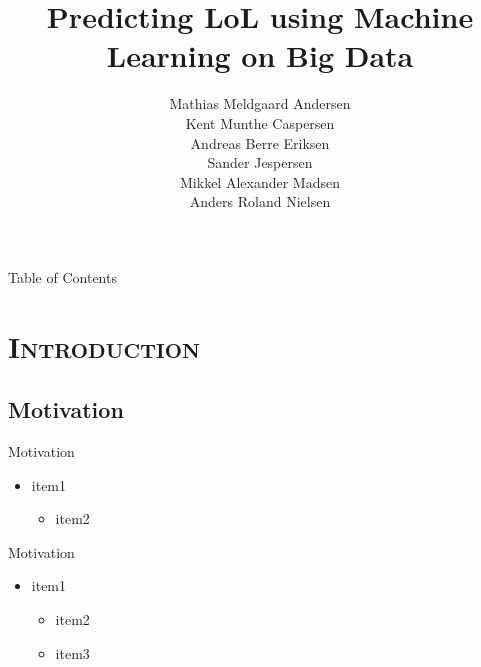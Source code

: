 
\begin{frame}
\title{\huge Predicting LoL using Machine Learning on Big Data}

\author{
	Mathias Meldgaard Andersen\\
	Kent Munthe Caspersen\\
	Andreas Berre Eriksen\\
	Sander Jespersen\\
	Mikkel Alexander Madsen\\
	Anders Roland Nielsen\\
}

\titlepage
\end{frame}

\begin{frame}{Table of Contents}
\tableofcontents
\end{frame}

\section{\scshape Introduction}
\subsection{Motivation}

\begin{frame}{Motivation}
\begin{itemize}
\item item1
\begin{itemize}
\item item2
\end{itemize}
\end{itemize}
\vspace{20cm}
\end{frame}

\begin{frame}{Motivation}
\begin{itemize}
\item item1
\begin{itemize}
\item item2
\item item3
\end{itemize}
\end{itemize}
\vspace{20cm}
\end{frame}
